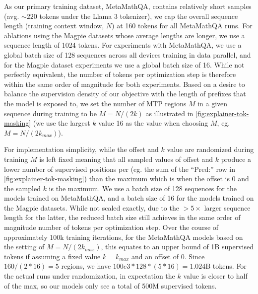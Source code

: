 \documentclass{article}
\theoremstyle{plain}
\theoremstyle{definition}
\theoremstyle{remark}
\begin{document}
As our primary training dataset, MetaMathQA, contains relatively short samples (avg. $\sim 220$ tokens under the Llama 3 tokenizer), we cap the overall sequence length (training context window, $N$) at 160 tokens for all MetaMathQA runs. For ablations using the Magpie datasets whose average lengths are longer, we use a sequence length of 1024 tokens. For experiments with MetaMathQA, we use a global batch size of 128 sequences across all devices training in data parallel, and for the Magpie dataset experiments we use a global batch size of 16. While not perfectly equivalent, the number of tokens per optimization step is therefore within the same order of magnitude for both experiments. Based on a desire to balance the supervision density of our objective with the length of prefixes that the model is exposed to, we set the number of MTP regions $M$ in a given sequence during training to be $M=N/(2k)$ as illustrated in \cref{fig:explainer-tok-masking} (we use the largest $k$ value 16 as the value when choosing $M$, eg. $M=N/(2k_{max})$).

For implementation simplicity, while the offset and $k$ value are randomized during training $M$ is left fixed meaning that all sampled values of offset and $k$ produce a lower number of supervised positions per (eg. the sum of the ``Pred:'' row in \cref{fig:explainer-tok-masking}) than the maximum which is when the offset is 0 and the sampled $k$ is the maximum. We use a batch size of 128 sequences for the models trained on MetaMathQA, and a batch size of 16 for the models trained on the Magpie datasets. While not scaled exactly, due to the $> 5\times$ larger sequence length for the latter, the reduced batch size still achieves in the same order of magnitude number of tokens per optimization step. Over the course of approximately 100k training iterations, for the MetaMathQA models based on the setting of $M=N/(2k_{max})$, this equates to an upper bound of 1B supervised tokens if assuming a fixed value $k=k_{max}$ and an offset of 0. Since $160 /(2*16) = 5$ regions, we have $100e3 * 128 * (5 * 16) = 1.024$B tokens. For the actual runs under randomization, in expectation the $k$ value is closer to half of the max, so our models only see a total of 500M supervised tokens. 
\end{document}
